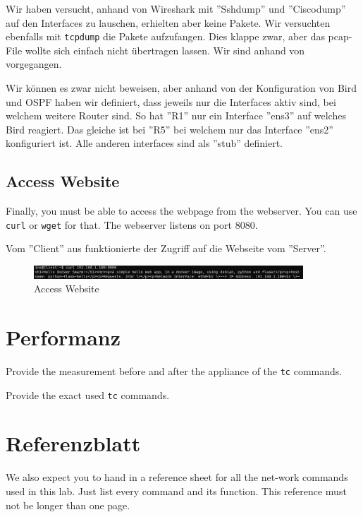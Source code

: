 \documentclass[11pt,titlepage]{article}
\newenvironment{shadedquotation}
 {\begin{shaded*}
  \quoting[leftmargin=0pt, vskip=0pt]
 }
 {\endquoting
 \end{shaded*}
}
\begin{document}
Wir haben versucht, anhand von Wireshark mit ''Sshdump'' und ''Ciscodump'' auf den Interfaces zu lauschen, erhielten aber keine Pakete.
Wir versuchten ebenfalls mit \lstinline!tcpdump! die Pakete aufzufangen. Dies klappe zwar, aber das pcap-File wollte sich einfach nicht übertragen lassen. Wir sind anhand von \cite{TCPDUMP} vorgegangen.

\medskip

Wir können es zwar nicht beweisen, aber anhand von der Konfiguration von Bird und OSPF haben wir definiert, dass jeweils nur die Interfaces aktiv sind, bei welchem weitere Router sind. So hat ''R1'' nur ein Interface ''ens3'' auf welches Bird reagiert. Das gleiche ist bei ''R5'' bei welchem nur das Interface ''ens2'' konfiguriert ist. Alle anderen interfaces sind als ''stub'' definiert.

\subsection{Access Website}
\label{subsec:AccessWebsite}
\begin{shadedquotation}
  Finally, you must be able to access the webpage from the webserver. You can use \lstinline!curl! or \lstinline!wget! for that. The webserver listens on port 8080.
\end{shadedquotation}
Vom ''Client'' aus funktionierte der Zugriff auf die Webseite vom ''Server''.
\begin{figure}[H]
	\begin{center}
		\includegraphics[width=0.90\textwidth]{"images/Verifikation Access Website"}
		\caption{Access Website}
		\label{fig:verifikation-access-website}
	\end{center}
\end{figure}

\section{Performanz}
\label{sec:Performanz}
\begin{shadedquotation}
  Provide the measurement before and after the appliance of the \lstinline!tc! commands.
  
  Provide the exact used \lstinline!tc! commands.
\end{shadedquotation}

\section{Referenzblatt}
\label{sec:Referenzblatt}
\begin{shadedquotation}
  We also expect you to hand in a reference sheet for all the net-work commands used in this lab. Just list every command and its function. This reference must not be longer than one page.
\end{shadedquotation}
\end{document}
